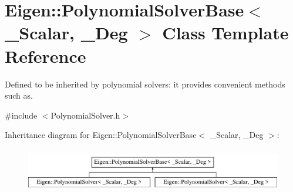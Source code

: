 \hypertarget{class_eigen_1_1_polynomial_solver_base}{}\section{Eigen\+:\+:Polynomial\+Solver\+Base$<$ \+\_\+\+Scalar, \+\_\+\+Deg $>$ Class Template Reference}
\label{class_eigen_1_1_polynomial_solver_base}


Defined to be inherited by polynomial solvers\+: it provides convenient methods such as.  




{\ttfamily \#include $<$Polynomial\+Solver.\+h$>$}

Inheritance diagram for Eigen\+:\+:Polynomial\+Solver\+Base$<$ \+\_\+\+Scalar, \+\_\+\+Deg $>$\+:\begin{figure}[H]
\begin{center}
\leavevmode
\includegraphics[height=1.924399cm]{class_eigen_1_1_polynomial_solver_base}
\end{center}
\end{figure}
